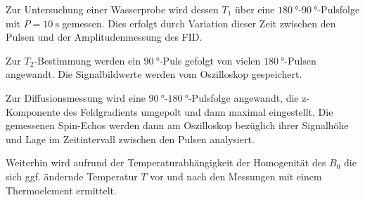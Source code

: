 Zur Untersuchung einer Wasserprobe wird dessen $T_1$ über eine $\SI{180}{\degree}$-$\SI{90}{\degree}$-Pulsfolge
mit $P = \SI{10}{\second}$ gemessen. Dies erfolgt durch Variation dieser Zeit zwischen den Pulsen
und der Amplitudenmessung des FID.

Zur $T_2$-Bestimmung werden ein $\SI{90}{\degree}$-Puls gefolgt von vielen $\SI{180}{\degree}$-Pulsen angewandt.
Die Signalbildwerte werden vom Oszilloskop gespeichert.

Zur Diffusionsmessung wird eine $\SI{90}{\degree}$-$\SI{180}{\degree}$-Pulsfolge angewandt,
die z-Komponente des Feldgradients umgepolt und dann maximal eingestellt.
Die gemessenen Spin-Echos werden dann am Oszilloskop bezüglich ihrer Signalhöhe und Lage im Zeitintervall 
zwischen den Pulsen analysiert.

Weiterhin wird aufrund der Temperaturabhängigkeit der Homogenität des $B_0$ die sich ggf. 
ändernde Temperatur $T$ vor und nach den Messungen mit einem Thermoelement ermittelt.
